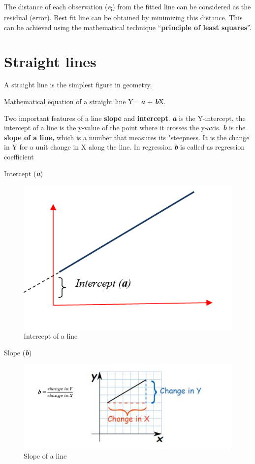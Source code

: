 \documentclass[
]{book}
\begin{document}
The distance of each observation (\emph{e}\textsubscript{i}) from the fitted line can be
considered as the residual (error). Best fit line can be obtained by
minimizing this distance. This can be achieved using the mathematical
technique ``\textbf{principle of least squares}''.

\hypertarget{straight-lines}{%
\section{Straight lines}\label{straight-lines}}

A straight line is the simplest figure in geometry.

Mathematical equation of a straight line Y= \textbf{\emph{a}} + \textbf{\emph{b}}X.

Two important features of a line \textbf{slope} and \textbf{intercept}. \textbf{\emph{a}} is
the Y-intercept, the intercept of a line is the y-value of the point
where it crosses the y-axis. \textbf{\emph{b}} is the \textbf{slope of a line,} which
is a number that measures its "steepness. It is the change in Y for a
unit change in X along the line. In regression \textbf{\emph{b}} is called as
regression coefficient

Intercept (\textbf{\emph{a}})

\begin{figure}

{\centering \includegraphics[width=0.5\linewidth]{images/r92} 

}

\caption{Intercept of a line }\label{fig:r4}
\end{figure}

Slope (\textbf{\emph{b}})

\begin{figure}

{\centering \includegraphics[width=0.5\linewidth]{images/r93} 

}

\caption{Slope of a line }\label{fig:r5}
\end{figure}
\end{document}
